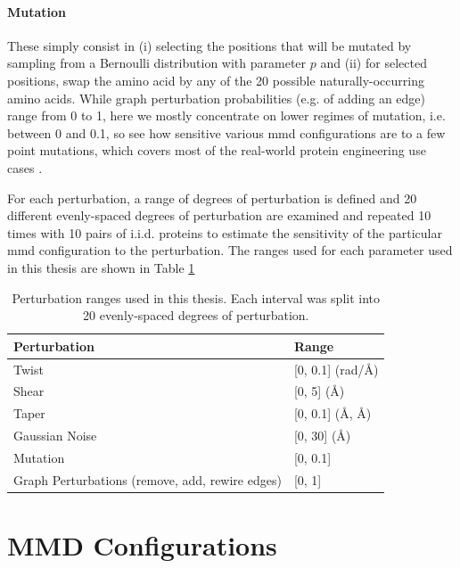 \paragraph{Mutation} These simply consist in (i) selecting the positions that
will be mutated by sampling from a Bernoulli distribution with parameter $p$ and
(ii) for selected positions, swap the amino acid by any of the 20 possible
naturally-occurring amino acids. While graph perturbation probabilities (e.g. of
adding an edge) range from 0 to 1, here we mostly concentrate on lower regimes
of mutation, i.e. between 0 and 0.1, so see how sensitive various \acrshort{mmd}
configurations are to a few point mutations, which covers most of the
real-world %
protein engineering use cases \citep{poluri2017protein}.

For each perturbation, a range of degrees of perturbation is defined and 20
different evenly-spaced degrees of perturbation are examined and repeated 10
times with 10 pairs of i.i.d. proteins to estimate the sensitivity of the
particular \acrshort{mmd} configuration to the perturbation. The ranges used for each
parameter used in this thesis are shown in Table \ref{tab:perturbation_ranges}


\begin{table}
  \centering
  \begin{tabular}{>{\raggedright\arraybackslash}p{4.8cm}l}
    \toprule
    \textbf{Perturbation} & \textbf{Range} \\
    \midrule
    Twist & [0, 0.1] (rad/\si{\angstrom})\\
    Shear & [0, 5] (\si{\angstrom}) \\
    Taper & [0, 0.1] (\si{\angstrom}, \si{\angstrom}) \\
    Gaussian Noise & [0, 30] (\si{\angstrom}) \\
    Mutation & [0, 0.1]\\
    Graph Perturbations (remove, add, rewire edges) & [0, 1]\\
    \bottomrule
  \end{tabular}
  \caption[Perturbation ranges used in this thesis.]{Perturbation ranges used in this thesis. Each interval was split into
    20 evenly-spaced degrees of perturbation.}
  \label{tab:perturbation_ranges}
\end{table}

\section{MMD Configurations}

